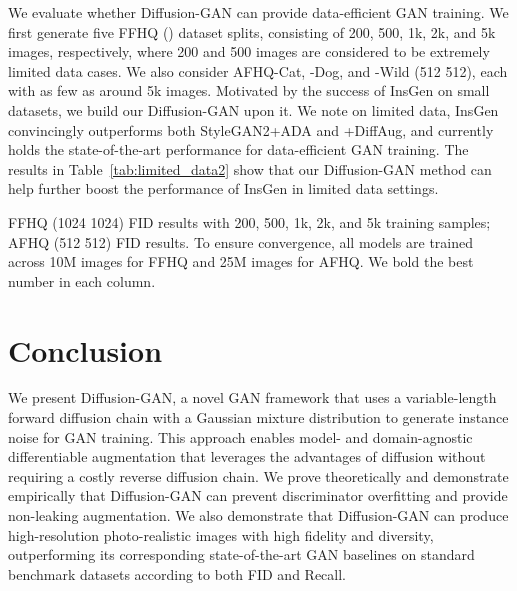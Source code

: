 \documentclass{article} \usepackage{iclr2023_conference,times}
\theoremstyle{plain}
\theoremstyle{definition}
\theoremstyle{remark}
\begin{document}
We evaluate whether Diffusion-GAN can provide data-efficient GAN training. 
We first generate five FFHQ () dataset splits, consisting of 200, 500, 1k, 2k, and 5k images, respectively, where 200 and 500 images are considered to be extremely limited data cases. We also consider AFHQ-Cat, -Dog, and -Wild (512  512), each with as few as around 5k images. Motivated by the success of InsGen \citep{yang2021data} on small datasets, we build our Diffusion-GAN upon it. We note on limited data, InsGen convincingly outperforms both StyleGAN2+ADA and +DiffAug, and currently holds the state-of-the-art performance for data-efficient GAN training. The results in Table~\ref{tab:limited_data2} show that our Diffusion-GAN method can help further boost the performance of InsGen in limited data settings.

\begin{table}[ht]
    \caption{\small {FFHQ} (1024  1024) FID results with 200, 500, 1k, 2k, and 5k training samples; AFHQ (512  512) FID results. To ensure convergence, all models are trained across 10M images for FFHQ and 25M images for AFHQ. We bold the best number in each column. }
    \label{tab:limited_data2}
     \vspace{-2mm}
    \centering
\end{table}





\section{Conclusion}

We present Diffusion-GAN, a novel GAN framework that uses a variable-length forward diffusion chain with a Gaussian mixture distribution to generate instance noise for GAN training. This approach enables model- and domain-agnostic differentiable augmentation that leverages the advantages of diffusion without requiring a costly reverse diffusion chain. We prove theoretically and demonstrate empirically that Diffusion-GAN can prevent discriminator overfitting and provide non-leaking augmentation. We also demonstrate that Diffusion-GAN can produce high-resolution photo-realistic images with high fidelity and diversity, outperforming its corresponding state-of-the-art GAN baselines on standard benchmark datasets according to both FID and Recall.
\end{document}
